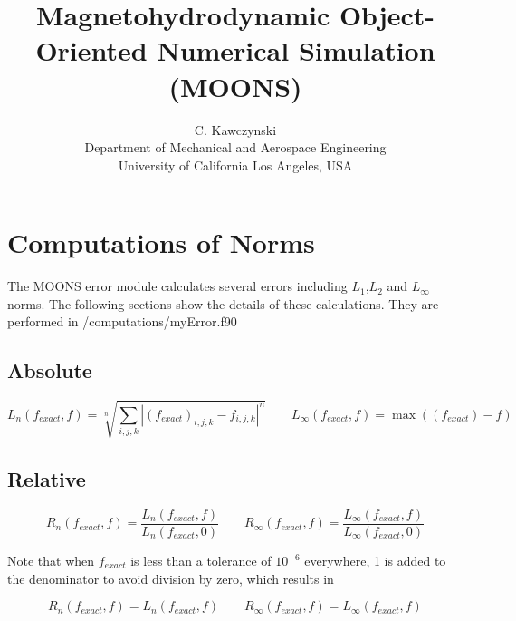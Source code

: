 \documentclass[11pt]{article}
\begin{document}
\doublespacing
\title{Magnetohydrodynamic Object-Oriented Numerical Simulation (MOONS)}
\author{C. Kawczynski \\
Department of Mechanical and Aerospace Engineering \\
University of California Los Angeles, USA\\
}
\maketitle

\section{Computations of Norms}
The MOONS error module calculates several errors including $L_1$,$L_2$ and $L_{\infty}$ norms. The following sections show the details of these calculations. They are performed in /computations/myError.f90

\subsection{Absolute}
\begin{equation}
L_n(f_{exact},f) =  \sqrt[n]{\sum_{i,j,k} |(f_{exact})_{i,j,k} - f_{i,j,k}|^n} \qquad
L_\infty(f_{exact},f) = \max( (f_{exact}) - f )
\end{equation}

\subsection{Relative}
\begin{equation}
R_{n}(f_{exact},f) = \frac{L_n(f_{exact},f)}{L_n(f_{exact},0)} \qquad
R_{\infty}(f_{exact},f) = \frac{L_\infty(f_{exact},f)}{L_\infty(f_{exact},0)}
\end{equation}

Note that when $f_{exact}$ is less than a tolerance of $10^{-6}$ everywhere, 1 is added to the denominator to avoid division by zero, which results in

\begin{equation}
R_{n}(f_{exact},f) = L_n(f_{exact},f) \qquad
R_{\infty}(f_{exact},f) = L_\infty(f_{exact},f)
\end{equation}
\end{document}
